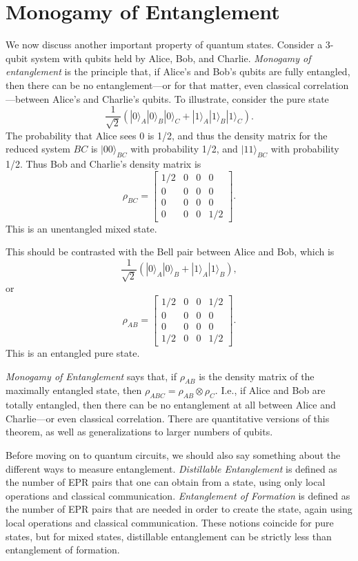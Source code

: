 \documentclass[12pt]{report}
\theoremstyle{plain}
\theoremstyle{definition}
\renewcommand{\ket}[1]{|#1\rangle}
\begin{document}
\section{Monogamy of Entanglement}

We now discuss another important property of quantum states. Consider a 3-qubit system with qubits held by Alice, Bob, and Charlie.
\emph{Monogamy of entanglement} is the principle that, if Alice's and Bob's qubits are fully entangled,
then there can be no entanglement---or for that matter, even classical correlation---between
Alice's and Charlie's qubits.  To illustrate, consider the pure state
$$\frac{1}{\sqrt{2}}(\ket{0}_A\ket{0}_B\ket{0}_C + \ket{1}_A\ket{1}_B\ket{1}_C).$$
The probability that Alice sees 0 is 1/2, and thus the density matrix
for the reduced system $BC$ is $\ket{00}_{BC}$ with probability 1/2,
and $\ket{11}_{BC}$ with probability 1/2.
Thus Bob and Charlie's density matrix is
$$\rho_{BC} = \begin{bmatrix}
1/2 & 0 & 0 & 0 \\
0 & 0 & 0 & 0 \\
0 & 0 & 0 & 0 \\
0 & 0 & 0 & 1/2
\end{bmatrix}.$$
This is an unentangled mixed state.

This should be contrasted with the Bell pair between
Alice and Bob, which is
$$\frac{1}{\sqrt{2}}(\ket{0}_A\ket{0}_B + \ket{1}_A\ket{1}_B),$$
or
$$\rho_{AB} = \begin{bmatrix}
1/2 & 0 & 0 & 1/2 \\
0 & 0 & 0 & 0 \\
0 & 0 & 0 & 0 \\
1/2 & 0 & 0 & 1/2
\end{bmatrix}.$$
This is an entangled pure state.

{\em Monogamy of Entanglement} says that, if $\rho_{AB}$ is the density matrix
of the maximally entangled state, then $\rho_{ABC} = \rho_{AB} \otimes \rho_C$.
I.e., if Alice and Bob are totally entangled, then there can be no entanglement
at all between Alice and Charlie---or even classical correlation.  There are quantitative versions of this theorem, as well as
generalizations to larger numbers of qubits.

Before moving on to quantum circuits, we should also say something about the different
ways to measure entanglement.  {\em Distillable Entanglement} is defined as the number of EPR pairs that one can obtain from a state, using only
local operations and classical communication.
{\em Entanglement of Formation} is defined as the number of EPR
pairs that are needed in order to create the state, again using local operations and classical communication.  These notions
coincide for pure states, but for mixed states, distillable entanglement can be strictly less than entanglement of formation.
\end{document}
